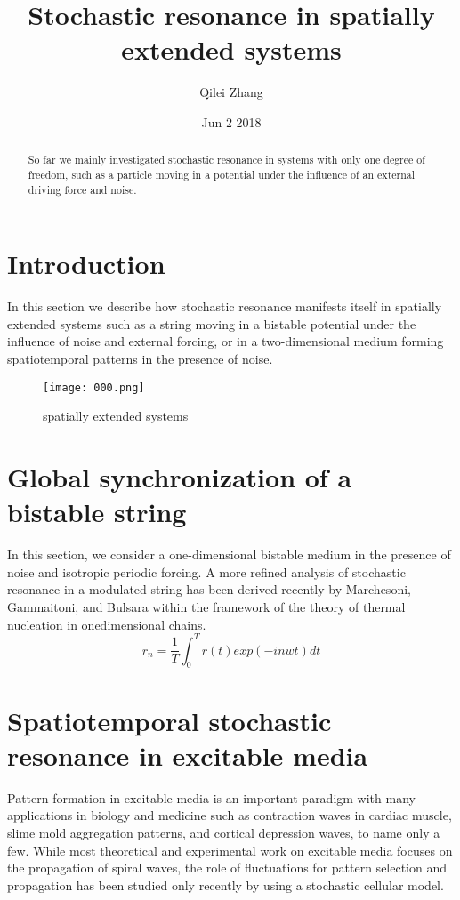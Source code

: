 \documentclass[30pt,twocolumn,letterpaper]{article}
\author{Qilei Zhang}
\date{Jun 2 2018}
\title{Stochastic resonance in spatially extended systems}
\begin{document}
\maketitle
\begin{abstract}
   So far we mainly investigated stochastic resonance in systems with only one degree of freedom, such as a particle moving in a potential under the influence of an external driving force and noise.
\end{abstract}
\section{Introduction}
In this section we describe how stochastic resonance manifests itself in spatially extended systems such as a string moving in a bistable potential under the influence of noise and external forcing, or in a two-dimensional medium forming spatiotemporal patterns in the presence of noise\cite{Carroll1993Stochastic}.
\begin{figure}[htbp]
\small
\centering
\texttt{[image: 000.png]}
\caption{spatially extended systems}
\label{fig:lable}
\end{figure}
\section{Global synchronization of a bistable string}
In this section, we consider a one-dimensional bistable medium in the presence of noise and isotropic periodic forcing. A more refined analysis of stochastic resonance in a modulated string has been derived recently by Marchesoni, Gammaitoni, and Bulsara within the framework of the theory of thermal nucleation in onedimensional chains\cite{Neiman1994Stochastic}. \\
\begin{equation}
r_n=\frac{1}{T}\int_0^T r(t)exp(-inwt)dt
\end{equation}
\section{Spatiotemporal stochastic resonance in excitable media}
Pattern formation in excitable media is an important paradigm with many applications in biology and medicine such as contraction waves in cardiac muscle, slime mold aggregation patterns, and cortical depression waves, to name only a few. While most theoretical and experimental work on excitable media focuses on the propagation of spiral waves, the role of fluctuations for pattern selection and propagation has been studied only recently by using a stochastic cellular model\cite{Rallabandi2010Magnetic}.
{\small


}
\end{document}
